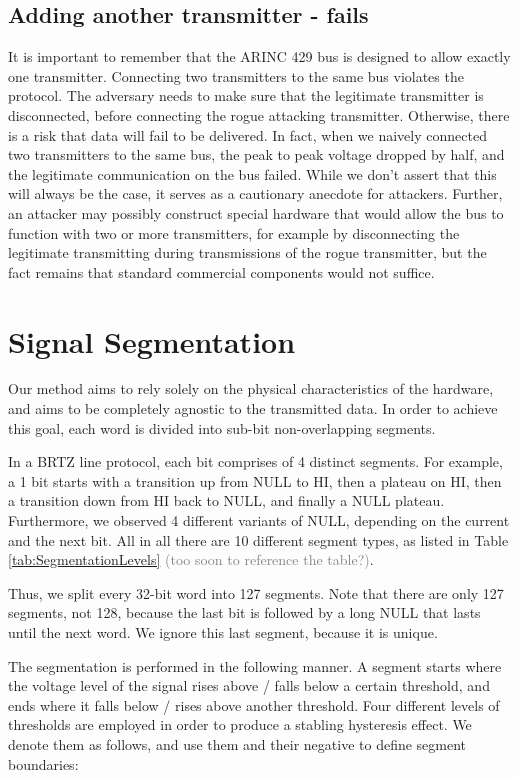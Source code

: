 \documentclass[conference]{IEEEtran}
\begin{document}
\subsection{Adding another transmitter - fails}
  It is important to remember that the ARINC 429 bus is designed to allow exactly one transmitter. Connecting two transmitters to the same bus violates the protocol. The adversary needs to make sure that the legitimate transmitter is disconnected, before connecting the rogue attacking transmitter. Otherwise, there is a risk that data will fail to be delivered. In fact, when we naively connected two transmitters to the same bus, the peak to peak voltage dropped by half, and the legitimate communication on the bus failed. While we don't assert that this will always be the case, it serves as a cautionary anecdote for attackers. Further, an attacker may possibly construct special hardware that would allow the bus to function with two or more transmitters, for example by disconnecting the legitimate transmitting during transmissions of the rogue transmitter, but the fact remains that standard commercial components would not suffice.

\section{Signal Segmentation}
  Our method aims to rely solely on the physical characteristics of the hardware, and aims to be completely agnostic to the transmitted data. In order to achieve this goal, each word is divided into sub-bit non-overlapping segments.
  
  In a BRTZ line protocol, each bit comprises of 4 distinct segments. For example, a 1 bit starts with a transition up from NULL to HI, then a plateau on HI, then a transition down from HI back to NULL, and finally a NULL plateau. Furthermore, we observed 4 different variants of NULL, depending on the current and the next bit. All in all there are 10 different segment types, as listed in Table \ref{tab:SegmentationLevels} \textcolor{gray}{(too soon to reference the table?)}.
  
  Thus, we split every 32-bit word into 127 segments. Note that there are only 127 segments, not 128, because the last bit is followed by a long NULL that lasts until the next word. We ignore this last segment, because it is unique.
  
  The segmentation is performed in the following manner. A segment starts where the voltage level of the signal rises above / falls below a certain threshold, and ends where it falls below / rises above another threshold. Four different levels of thresholds are employed in order to produce a stabling hysteresis effect. We denote them as follows, and use them and their negative to define segment boundaries:
  
\end{document}
